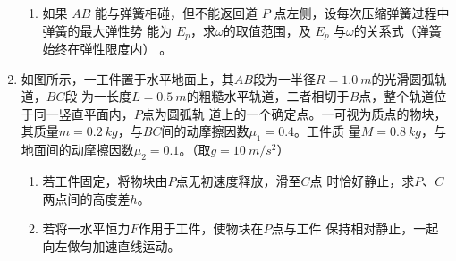 \begin{enumerate}
\begin{enumerate}
\item 
如果 $ AB $ 能与弹簧相碰，但不能返回道 $ P $ 点左侧，设每次压缩弹簧过程中弹簧的最大弹性势
能为 $ E_{p} $，求$ \omega $的取值范围，及 $ E_{p} $ 与$ \omega $的关系式（弹簧始终在弹性限度内）
。



\end{enumerate}
\begin{figure}[h!]
\flushright

\end{figure}




\newpage
\item 
{}
如图所示，一工件置于水平地面上，其$ AB $段为一半径$ R=1.0 \ m $的光滑圆弧轨道，$ BC $段
为一长度$ L=0.5 \ m $的粗糙水平轨道，二者相切于$ B $点，整个轨道位于同一竖直平面内，$ P $点为圆弧轨
道上的一个确定点。一可视为质点的物块，其质量$ m=0.2 \ kg $，与$ BC $间的动摩擦因数$ \mu _{1}=0.4 $。工件质
量$ M=0.8 \ kg $，与地面间的动摩擦因数$ \mu _{2}=0.1 $。（取$ g=10 \ m/s^{2} $）
\begin{enumerate}
\renewcommand{\labelenumi}{\arabic{enumi}.}
\item
若工件固定，将物块由$ P $点无初速度释放，滑至$ C $点
时恰好静止，求$ P $、$ C $ 两点间的高度差$ h $。

\item 
若将一水平恒力$ F $作用于工件，使物块在$ P $点与工件
保持相对静止，一起向左做匀加速直线运动。


\end{enumerate}
\end{enumerate}
